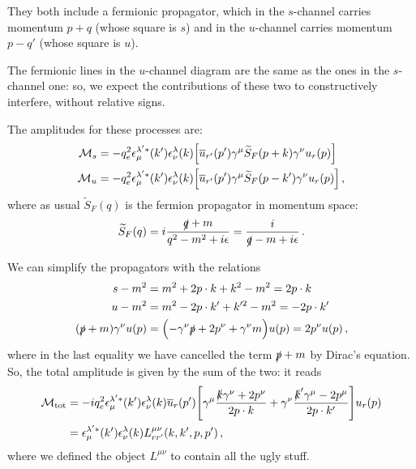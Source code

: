 \documentclass[main.tex]{subfiles}
\begin{document}
They both include a fermionic propagator, which in the \(s\)-channel carries momentum \(p+q\) (whose square is \(s\)) and in the \(u\)-channel carries momentum \(p - q'\) (whose square is \(u\)). 

The fermionic lines in the \(u\)-channel diagram are the same as the ones in the \(s\)-channel one: so, we expect the contributions of these two to constructively interfere, without relative signs. 

The amplitudes for these processes are: 
%
\begin{align}
\mathcal{M}_{s} &= - q_e^2 
\epsilon^{\lambda^{\prime} *}_{\mu } (k')
\epsilon^{\lambda }_{\nu } (k)
\qty[
\overline{u}_{r'} (p') \gamma^{\mu }
\widetilde{S}_{F} (p+k) \gamma^{\nu }  u_r (p) 
] \\
\mathcal{M}_{u} &= - q_e^2 
\epsilon^{\lambda^{\prime} *}_{\mu } (k')
\epsilon^{\lambda }_{\nu } (k)
\qty[
\overline{u}_{r'} (p') \gamma^{\mu }
\widetilde{S}_{F} (p-k') \gamma^{\nu }  u_r (p) 
]
\,,
\end{align}
%
where as usual \(\widetilde{S}_F (q)\) is the fermion propagator in momentum space: 
%
\begin{align}
\widetilde{S}_{F} (q) = i \frac{\slashed{q} + m}{q^2 - m^2 + i \epsilon } = \frac{i}{\slashed{q} - m + i \epsilon }
\,.
\end{align}

We can simplify the propagators with the relations 
%
\begin{align}
s - m^2 &= m^2+ 2 p \cdot k + k^2 - m^2 = 2 p \cdot k  \\
u - m^2 &= m^2- 2 p \cdot k' + k^{\prime 2} - m^2 = -2 p \cdot k'  \\
(\slashed{p} + m)\gamma^{\nu } u(p) &= 
\qty(- \gamma^{\nu} \slashed{p} + 2 p^{\nu } + \gamma^{\nu }m) u(p) = 2 p^{\nu } u(p)
\,,
\end{align}
%
where in the last equality we have cancelled the term \(\slashed{p} + m\) by Dirac's equation. So, the total amplitude is given by the sum of the two: it reads 
%
\begin{align}
\mathcal{M} _{\text{tot}}
&= - i q_e^2 
\epsilon^{\lambda^{\prime} *}_{\mu } (k')
\epsilon^{\lambda }_{\nu } (k)
\overline{u}_{r} (p') \qty[\gamma^{\mu } \frac{\slashed{k} \gamma^{\nu } + 2 p^{\nu }}{2 p \cdot k} + \gamma^{\nu } \frac{\slashed{k}' \gamma^{\mu} - 2 p^{\mu }}{2 p \cdot k'}] u_r (p)  \\
&= \epsilon^{\lambda^{\prime} *}_{\mu } (k')
\epsilon^{\lambda }_{\nu } (k)
L^{\mu \nu }_{r r '} (k, k', p, p')
\,,
\end{align}
%
where we defined the object \(L^{\mu \nu }\) to contain all the ugly stuff. 
\end{document}
